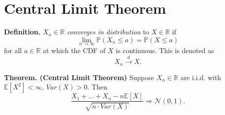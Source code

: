\documentclass{article}[11pt]
\begin{document}
\section{Central Limit Theorem}

\textbf{Definition.} $X_n\in \mathbb{R}$ \emph{converges in distribution} to $X \in \mathbb{R}$ if
                     $$\lim_{n \to \infty}\mathbb{P}(X_n \leq a) = \mathbb{P}(X \leq a)$$
                     for all $a \in \mathbb{R}$ at which the CDF of $X$ is continuous. This is denoted as $$X_n \xrightarrow{d} X.$$

                     \textbf{Theorem. (Central Limit Theorem)} Suppose $X_n \in \mathbb{R}$ are i.i.d. with $\mathbb{E}[X^2] < \infty$, $Var(X) > 0$. Then
                     $$\frac{X_1+\dots+X_n - n\mathbb{E}[X]}{\sqrt{n\cdot Var(X)}} \Rightarrow \mathcal{N}(0,1).$$
\end{document}
